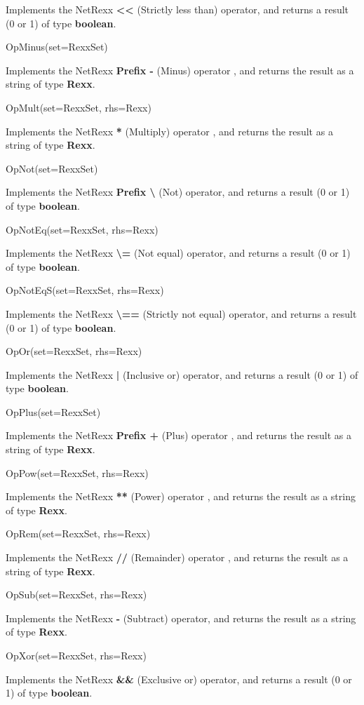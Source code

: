\begin{description}
Implements the NetRexx \textbf{\textbf{<<}} (Strictly less than)
operator, and returns a result (0 or 1) of type \textbf{boolean}.
\item{OpMinus(set=RexxSet)}

Implements the NetRexx \textbf{\textbf{Prefix -}} (Minus) operator
, and returns the result as a string of type \textbf{Rexx}.
\item{OpMult(set=RexxSet, rhs=Rexx)}

Implements the NetRexx \textbf{\textbf{*}} (Multiply) operator
, and returns the result as a string of type \textbf{Rexx}.
\item{OpNot(set=RexxSet)}

Implements the NetRexx \textbf{\textbf{Prefix \textbackslash }} (Not)
operator, and returns a result (0 or 1) of type \textbf{boolean}.
\item{OpNotEq(set=RexxSet, rhs=Rexx)}

Implements the NetRexx \textbf{\textbf{\textbackslash =}} (Not equal)
operator, and returns a result (0 or 1) of type \textbf{boolean}.
\item{OpNotEqS(set=RexxSet, rhs=Rexx)}

Implements the NetRexx \textbf{\textbf{\textbackslash ==}} (Strictly not
equal) operator, and returns a result (0 or 1) of
type \textbf{boolean}.
\item{OpOr(set=RexxSet, rhs=Rexx)}

Implements the NetRexx \textbf{\textbf{|}} (Inclusive or)
operator, and returns a result (0 or 1) of type \textbf{boolean}.
\item{OpPlus(set=RexxSet)}

Implements the NetRexx \textbf{\textbf{Prefix +}} (Plus) operator
, and returns the result as a string of type \textbf{Rexx}.
\item{OpPow(set=RexxSet, rhs=Rexx)}

Implements the NetRexx \textbf{\textbf{**}} (Power) operator
, and returns the result as a string of type \textbf{Rexx}.
\item{OpRem(set=RexxSet, rhs=Rexx)}

Implements the NetRexx \textbf{\textbf{//}} (Remainder) operator
, and returns the result as a string of type \textbf{Rexx}.
\item{OpSub(set=RexxSet, rhs=Rexx)}

Implements the NetRexx \textbf{\textbf{-}} (Subtract) operator,
and returns the result as a string of type \textbf{Rexx}.
\item{OpXor(set=RexxSet, rhs=Rexx)}

Implements the NetRexx \textbf{\textbf{\&\&}} (Exclusive or)
operator, and returns a result (0 or 1) of
type \textbf{boolean}.
\end{description}
